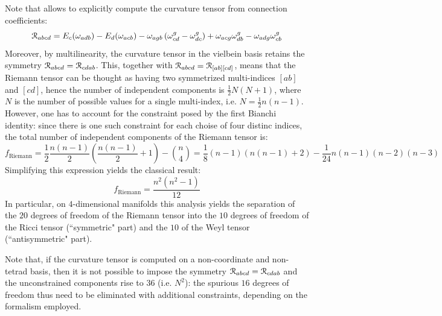 Note that  allows to explicitly compute the curvature tensor from connection coefficients:
\begin{equation}
  \EuScript{R}_{abcd} = E_c(\omega_{adb}) - E_d(\omega_{acb}) - \omega_{agb} \left( \omega^g_{cd} - \omega^g_{dc} \right) + \omega_{acg} \omega^g_{db} - \omega_{adg} \omega^g_{cb}
\end{equation}
Moreover, by multilinearity, the curvature tensor in the vielbein basis retains the symmetry $ \EuScript{R}_{abcd} = \EuScript{R}_{cdab} $. This, together with $ \EuScript{R}_{abcd} = \EuScript{R}_{[ab][cd]} $, means that the Riemann tensor can be thought as having two symmetrized multi-indices $ [ab] $ and $ [cd] $, hence the number of independent components is $ \frac{1}{2} N (N+1) $, where $ N $ is the number of possible values for a single multi-index, i.e. $ N = \frac{1}{2} n (n-1) $. However, one has to account for the constraint posed by the first Bianchi identity: since there is one such constraint for each choise of four distinc indices, the total number of independent components of the Riemann tensor is:
\begin{equation*}
  f_\text{Riemann} = \frac{1}{2} \frac{n (n-1)}{2} \left( \frac{n(n-1)}{2} + 1 \right) - \binom{n}{4} = \frac{1}{8} (n-1) (n (n-1) + 2) - \frac{1}{24} n (n-1) (n-2) (n-3)
\end{equation*}
Simplifying this expression yields the classical result:
\begin{equation}
  f_\text{Riemann} = \frac{n^2 (n^2-1)}{12}
  \label{eq:riemann-deg-freedom}
\end{equation}
In particular, on $ 4 $-dimensional manifolds this analysis yields the separation of the $ 20 $ degrees of freedom of the Riemann tensor into the $ 10 $ degrees of freedom of the Ricci tensor (``symmetric" part) and the $ 10 $ of the Weyl tensor (``antisymmetric" part).

Note that, if the curvature tensor is computed on a non-coordinate and non-tetrad basis, then it is not possible to impose the symmetry $ \EuScript{R}_{abcd} = \EuScript{R}_{cdab} $ and the unconstrained components rise to $ 36 $ (i.e. $ N^2 $): the spurious $ 16 $ degrees of freedom thus need to be eliminated with additional constraints, depending on the formalism employed.










